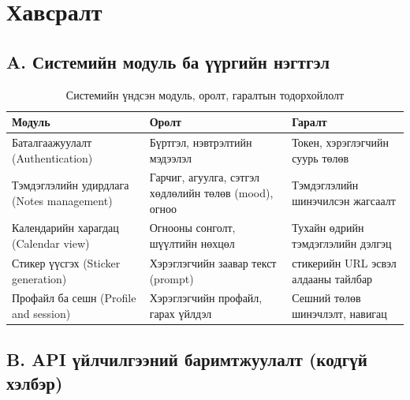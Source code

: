 
\chapter*{Хавсралт}

\section*{A. Системийн модуль ба үүргийн нэгтгэл}

\begin{table}[H]
\centering
\caption{Системийн үндсэн модуль, оролт, гаралтын тодорхойлолт}
\label{tab:appendix_module_summary}
\small
\begin{tabular}{>{\raggedright\arraybackslash}p{3.4cm}>{\raggedright\arraybackslash}p{4.3cm}>{\raggedright\arraybackslash}p{4.8cm}}
\toprule
\textbf{Модуль} & \textbf{Оролт} & \textbf{Гаралт} \\
\midrule
Баталгаажуулалт (Authentication) & Бүртгэл, нэвтрэлтийн мэдээлэл & Токен, хэрэглэгчийн суурь төлөв \\
Тэмдэглэлийн удирдлага (Notes management) & Гарчиг, агуулга, сэтгэл хөдлөлийн төлөв (mood), огноо & Тэмдэглэлийн шинэчилсэн жагсаалт \\
Календарийн харагдац (Calendar view) & Огнооны сонголт, шүүлтийн нөхцөл & Тухайн өдрийн тэмдэглэлийн дэлгэц \\
Стикер үүсгэх (Sticker generation) & Хэрэглэгчийн заавар текст (prompt) & стикерийн URL эсвэл алдааны тайлбар \\
Профайл ба сешн (Profile and session) & Хэрэглэгчийн профайл, гарах үйлдэл & Сешний төлөв шинэчлэлт, навигац \\
\bottomrule
\end{tabular}
\end{table}

\section*{B. API үйлчилгээний баримтжуулалт (кодгүй хэлбэр)}

